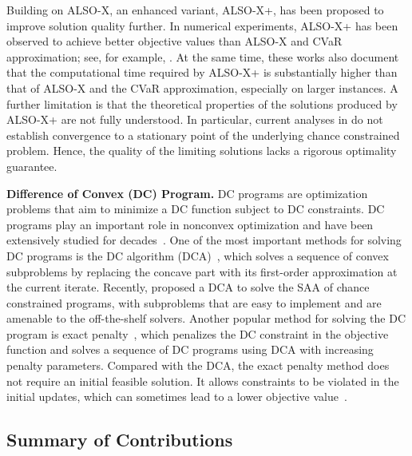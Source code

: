 \documentclass[11pt]{article}
\begin{document}
Building on ALSO-X, an enhanced variant, ALSO-X+, has been proposed to improve solution quality further. In numerical experiments, ALSO-X+ has been observed to achieve better objective values than ALSO-X and CVaR approximation; see, for example, \cite{xu2025nonparametric,wen2024stochastic,sun2025network}. At the same time, these works also document that the computational time required by ALSO-X+ is substantially higher than that of ALSO-X and the CVaR approximation, especially on larger instances. A further limitation is that the theoretical properties of the solutions produced by ALSO-X+ are not fully understood. In particular, current analyses in \cite{jiang2022also} do not establish convergence to a stationary point of the underlying chance constrained problem. Hence, the quality of the limiting solutions lacks a rigorous optimality guarantee.

\noindent\textbf{Difference of Convex (DC) Program.} 
DC programs are optimization problems that aim to minimize a DC function subject to DC constraints. DC programs play an important role in nonconvex optimization and have been extensively studied for decades~\cite{horst1999dc, tao1997convex}. One of the most important methods for solving DC programs is the DC algorithm (DCA)~\cite{hong2011sequential, lu2012sequential}, which solves a sequence of convex subproblems by replacing the concave part with its first-order approximation at the current iterate. Recently, \cite{wang2025proximal} proposed a DCA to solve the SAA of chance constrained programs, with subproblems that are easy to implement and are amenable to the off-the-shelf solvers. Another popular method for solving the DC program is exact penalty~\cite{lipp2016variations,gotoh2018dc, jara2018study}, which penalizes the DC constraint in the objective function and solves a sequence of DC programs using DCA with increasing penalty parameters. Compared with the DCA, the exact penalty method does not require an initial feasible solution. It allows constraints to be violated in the initial updates, which can sometimes lead to a lower objective value~\cite{lipp2016variations}. 

\subsection{Summary of Contributions}
\end{document}
